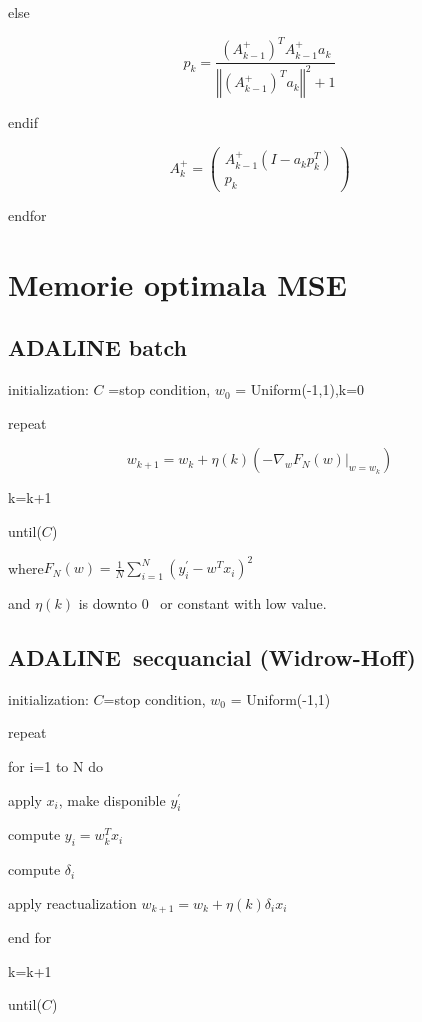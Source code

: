 \documentclass{article}
\begin{document}
\qquad else

\[
p_{k}=\frac{(A_{k-1}^{+})^{T}A_{k-1}^{+}a_{k}}{\left\Vert
(A_{k-1}^{+})^{T}a_{k}\right\Vert ^{2}+1} 
\]

\qquad endif

\[
A_{k}^{+}=\left( 
\begin{array}{c}
A_{k-1}^{+}(I-a_{k}p_{k}^{T}) \\ 
p_{k}%
\end{array}%
\right) 
\]

endfor

\section{Memorie optimala MSE}

\subsection{ADALINE batch}

initialization: $C$ =stop condition, $w_{0}$ = Uniform(-1,1),k=0

repeat

\[
w_{k+1}=w_{k}+\eta (k)(-\nabla _{w}F_{N}(w)|_{w=w_{k}}) 
\]

\qquad k=k+1

until($C$)

where\qquad $F_{N}(w)=\frac{1}{N}\sum_{i=1}^{N}(y_{i}^{\prime
}-w^{T}x_{i})^{2}$

and $\eta (k)$ is downto 0 \ or constant with low value.

\subsection{ADALINE\ secquancial (Widrow-Hoff)}

initialization: $C$=stop condition, $w_{0}$ = Uniform(-1,1)

repeat

\qquad for i=1 to N do

\qquad \qquad apply $x_{i}$, make disponible $y_{i}^{\prime }$

\qquad \qquad compute $y_{i}=w_{k}^{T}x_{i}$

\qquad \qquad compute $\delta _{i}$

\qquad \qquad apply reactualization $w_{k+1}=w_{k}+\eta (k)\delta _{i}x_{i}$

\qquad end for

\qquad k=k+1

until($C$)
\end{document}
